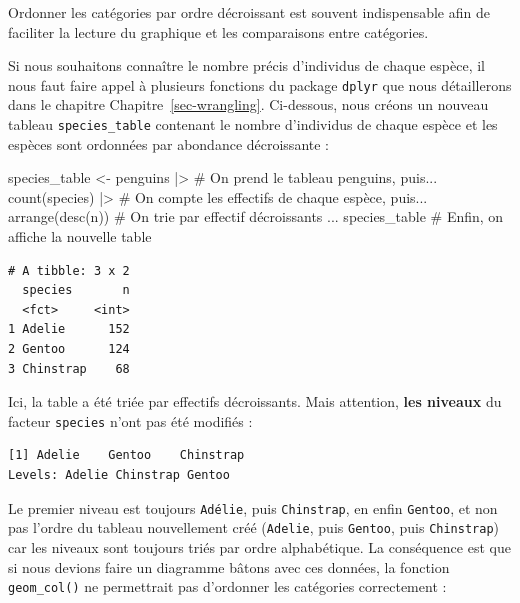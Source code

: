 \documentclass[
  a4paper,
  DIV=11,
  numbers=noendperiod,
  oneside]{scrreprt}
\newenvironment{Shaded}{}{}
\newcommand{\CommentTok}[1]{\textcolor[rgb]{0.42,0.45,0.49}{#1}}
\newcommand{\FunctionTok}[1]{\textcolor[rgb]{0.44,0.26,0.76}{#1}}
\newcommand{\NormalTok}[1]{\textcolor[rgb]{0.14,0.16,0.18}{#1}}
\newcommand{\OtherTok}[1]{\textcolor[rgb]{0.44,0.26,0.76}{#1}}
\newcommand{\SpecialCharTok}[1]{\textcolor[rgb]{0.00,0.36,0.77}{#1}}
\begin{document}
Ordonner les catégories par ordre décroissant est souvent indispensable
afin de faciliter la lecture du graphique et les comparaisons entre
catégories.

Si nous souhaitons connaître le nombre précis d'individus de chaque
espèce, il nous faut faire appel à plusieurs fonctions du package
\texttt{dplyr} que nous détaillerons dans le chapitre
Chapitre~\ref{sec-wrangling}. Ci-dessous, nous créons un nouveau tableau
\texttt{species\_table} contenant le nombre d'individus de chaque espèce
et les espèces sont ordonnées par abondance décroissante :

\begin{Shaded}
\begin{Highlighting}[]
\NormalTok{species\_table }\OtherTok{\textless{}{-}}\NormalTok{ penguins }\SpecialCharTok{|\textgreater{}}   \CommentTok{\# On prend le tableau penguins, puis...}
  \FunctionTok{count}\NormalTok{(species) }\SpecialCharTok{|\textgreater{}}            \CommentTok{\# On compte les effectifs de chaque espèce, puis...}
  \FunctionTok{arrange}\NormalTok{(}\FunctionTok{desc}\NormalTok{(n))              }\CommentTok{\# On trie par effectif décroissants ...}
\NormalTok{species\_table                   }\CommentTok{\# Enfin, on affiche la nouvelle table}
\end{Highlighting}
\end{Shaded}

\begin{verbatim}
# A tibble: 3 x 2
  species       n
  <fct>     <int>
1 Adelie      152
2 Gentoo      124
3 Chinstrap    68
\end{verbatim}

Ici, la table a été triée par effectifs décroissants. Mais attention,
\textbf{les niveaux} du facteur \texttt{species} n'ont pas été modifiés
:

\begin{Shaded}
\end{Shaded}

\begin{verbatim}
[1] Adelie    Gentoo    Chinstrap
Levels: Adelie Chinstrap Gentoo
\end{verbatim}

Le premier niveau est toujours \texttt{Adélie}, puis \texttt{Chinstrap},
en enfin \texttt{Gentoo}, et non pas l'ordre du tableau nouvellement
créé (\texttt{Adelie}, puis \texttt{Gentoo}, puis \texttt{Chinstrap})
car les niveaux sont toujours triés par ordre alphabétique. La
conséquence est que si nous devions faire un diagramme bâtons avec ces
données, la fonction \texttt{geom\_col()} ne permettrait pas d'ordonner
les catégories correctement :
\end{document}
